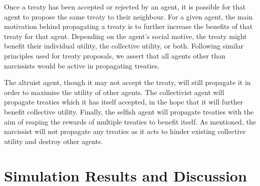 Once a treaty has been accepted or rejected by an agent, it is possible for that agent to propose the same treaty to their neighbour. For a given agent, the main motivation behind propagating a treaty is to further increase the benefits of that treaty for that agent. Depending on the agent's social motive, the treaty might benefit their individual utility, the collective utility, or both. Following similar principles used for treaty proposals, we assert that all agents other than narcissists would be active in propagating treaties.

The altruist agent, though it may not accept the treaty, will still propagate it in order to maximise the utility of other agents. The collectivist agent will propagate treaties which it has itself accepted, in the hope that it will further benefit collective utility. Finally, the selfish agent will propagate treaties with the aim of reaping the rewards of multiple treaties to benefit itself. As mentioned, the narcissist will not propagate any treaties as it acts to hinder existing collective utility and destroy other agents. 



\section{Simulation Results and Discussion}\label{simulation_results}

